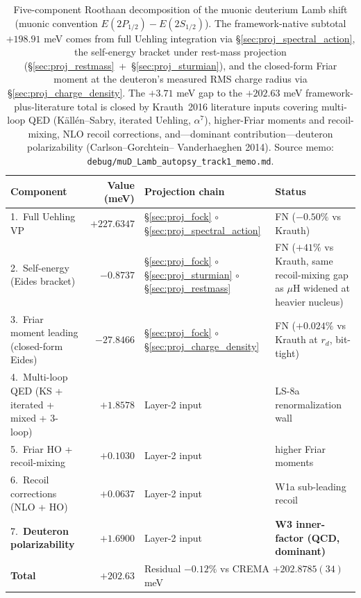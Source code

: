 \documentclass[11pt]{article}
\begin{document}
\begin{table}[h!]
\centering\small
\caption{Five-component Roothaan decomposition of the muonic
deuterium Lamb shift (muonic convention $E(2P_{1/2})-E(2S_{1/2})$).
The framework-native subtotal $+198.91$ meV comes from full Uehling
integration via \S\ref{sec:proj_spectral_action}, the self-energy
bracket under rest-mass projection
(\S\ref{sec:proj_restmass}~+~\S\ref{sec:proj_sturmian}), and the
closed-form Friar moment at the deuteron's measured RMS charge
radius via \S\ref{sec:proj_charge_density}.  The $+3.71$ meV gap
to the $+202.63$ meV framework-plus-literature total is closed by
Krauth~2016 literature inputs covering multi-loop QED
(K\"all\'en--Sabry, iterated Uehling, $\alpha^7$), higher-Friar
moments and recoil-mixing, NLO recoil corrections, and---dominant
contribution---deuteron polarizability (Carlson--Gorchtein--
Vanderhaeghen 2014).  Source memo:
\texttt{debug/muD\_Lamb\_autopsy\_track1\_memo.md}.}
\label{tab:autopsy_mud_lamb}
\begin{tabular}{p{4.7cm} r p{4.8cm} l}
\toprule
Component & Value (meV) & Projection chain & Status \\
\midrule
1.~Full Uehling VP & $+227.6347$ &
\S\ref{sec:proj_fock} $\circ$ \S\ref{sec:proj_spectral_action}
& FN ($-0.50\%$ vs Krauth) \\
2.~Self-energy (Eides bracket) & $-0.8737$ &
\S\ref{sec:proj_fock} $\circ$ \S\ref{sec:proj_sturmian}
$\circ$ \S\ref{sec:proj_restmass}
& FN ($+41\%$ vs Krauth, same recoil-mixing gap as $\mu$H widened
at heavier nucleus) \\
3.~Friar moment leading (closed-form Eides) & $-27.8466$ &
\S\ref{sec:proj_fock} $\circ$ \S\ref{sec:proj_charge_density}
& FN ($+0.024\%$ vs Krauth at $r_d$, bit-tight) \\
4.~Multi-loop QED (KS + iterated + mixed + 3-loop) & $+1.8578$ &
Layer-2 input & LS-8a renormalization wall \\
5.~Friar HO + recoil-mixing & $+0.1030$ &
Layer-2 input & higher Friar moments \\
6.~Recoil corrections (NLO + HO) & $+0.0637$ &
Layer-2 input & W1a sub-leading recoil \\
7.~\textbf{Deuteron polarizability} & $\mathbf{+1.6900}$ &
Layer-2 input & \textbf{W3 inner-factor (QCD, dominant)} \\
\midrule
\textbf{Total} & $+202.63$ & \multicolumn{2}{l}{Residual
$-0.12\%$ vs CREMA $+202.8785(34)$ meV} \\
\bottomrule
\end{tabular}
\end{table}
\end{document}
